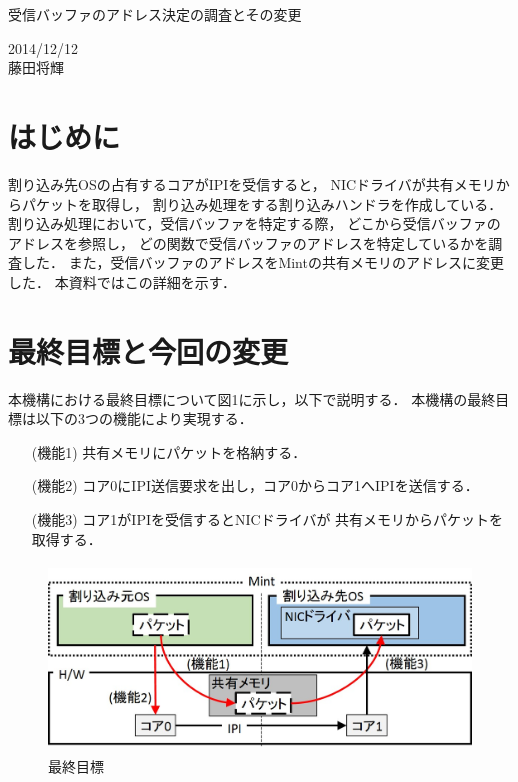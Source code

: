 \documentclass[12pt]{jsarticle}
\begin{document}

\begin{center}
{\LARGE 受信バッファのアドレス決定の調査とその変更}
\end{center}

\begin{flushright}
  2014/12/12\\
  藤田将輝
\end{flushright}
\section{はじめに}
割り込み先OSの占有するコアがIPIを受信すると，
NICドライバが共有メモリからパケットを取得し，
割り込み処理をする割り込みハンドラを作成している．
割り込み処理において，受信バッファを特定する際，
どこから受信バッファのアドレスを参照し，
どの関数で受信バッファのアドレスを特定しているかを調査した．
また，受信バッファのアドレスをMintの共有メモリのアドレスに変更した．
本資料ではこの詳細を示す．

\section{最終目標と今回の変更}
本機構における最終目標について図1に示し，以下で説明する．
本機構の最終目標は以下の3つの機能により実現する．

\begin{itemize}
    \item[(機能1)] 共有メモリにパケットを格納する．
    \item[(機能2)] コア0にIPI送信要求を出し，コア0からコア1へIPIを送信する．
    \item[(機能3)] コア1がIPIを受信するとNICドライバが
        共有メモリからパケットを取得する．
\end{itemize}


\begin{figure}[ht]
    \begin{center}
        \includegraphics[height=5.0cm]{./fig1.jpg}
        \caption{最終目標}
        \label{fig1}
    \end{center}
\end{figure}
\end{document}

